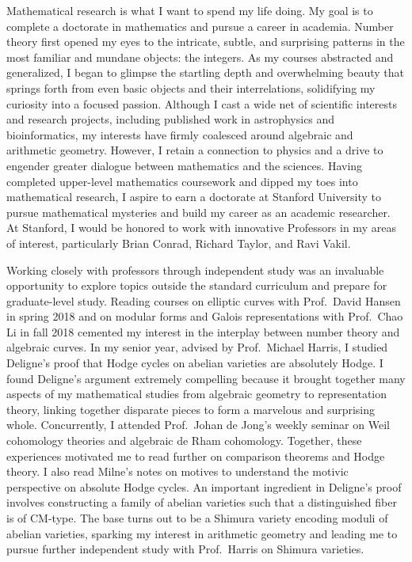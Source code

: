 \documentclass[11pt]{article}
\begin{document}
\noindent
Mathematical research is what I want to spend my life doing. My goal is to complete a doctorate in mathematics and pursue a career in academia. Number theory first opened my eyes to the intricate, subtle, and surprising patterns in the most familiar and mundane objects: the integers. As my courses abstracted and generalized, I began to glimpse the startling depth and overwhelming beauty that springs forth from even basic objects and their interrelations, solidifying my curiosity into a focused passion. Although I cast a wide net of scientific interests and research projects, including published work in astrophysics and bioinformatics, my interests have firmly coalesced around algebraic and arithmetic geometry. However, I retain a connection to physics and a drive to engender greater dialogue between mathematics and the sciences. Having completed upper-level mathematics coursework and dipped my toes into mathematical research, I aspire to earn a doctorate at Stanford University to pursue mathematical mysteries and build my career as an academic researcher. At Stanford, I would be honored to work with innovative Professors in my areas of interest, particularly Brian Conrad, Richard Taylor, and Ravi Vakil. 
\par
Working closely with professors through independent study was an invaluable opportunity to explore topics outside the standard curriculum and prepare for graduate-level study. 
Reading courses on elliptic curves with Prof.\ David Hansen in spring 2018 and on modular forms and Galois representations with Prof.\ Chao Li in fall 2018 cemented my interest in the interplay between number theory and algebraic curves. In my senior year, advised by Prof.\ Michael Harris, I studied Deligne's proof that Hodge cycles on abelian varieties are absolutely Hodge. I found Deligne's argument extremely compelling because it brought together many aspects of my mathematical studies from algebraic geometry to representation theory, linking together disparate pieces to form a marvelous and surprising whole. Concurrently, I attended Prof.\ Johan de Jong's weekly seminar on Weil cohomology theories and algebraic de Rham cohomology. Together, these experiences motivated me to read further on comparison theorems and Hodge theory. I also read Milne's notes on motives to understand the motivic perspective on absolute Hodge cycles. An important ingredient in Deligne's proof involves constructing a family of abelian varieties such that a distinguished fiber is of CM-type. The base turns out to be a Shimura variety encoding moduli of abelian varieties, sparking my interest in arithmetic geometry and leading me to pursue further independent study with Prof.\ Harris on Shimura varieties.
\end{document}
